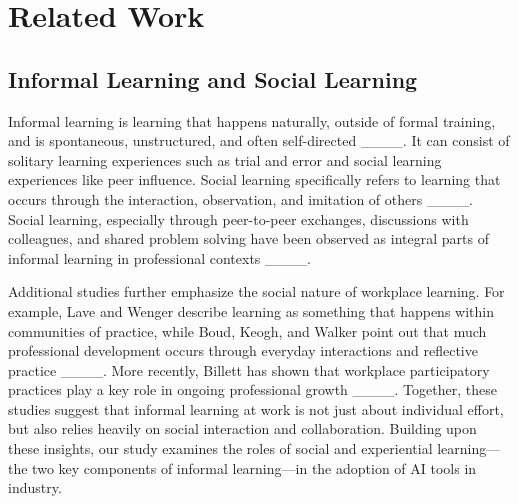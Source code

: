 \section{Related Work}
\subsection{Informal Learning and Social Learning}
Informal learning is learning that happens naturally, outside of formal training, and is spontaneous, unstructured, and often self-directed ____. It can consist of solitary learning experiences such as trial and error and social learning experiences like peer influence. Social learning specifically refers to learning that occurs through the interaction, observation, and imitation of others ____. Social learning, especially through peer-to-peer exchanges, discussions with colleagues, and shared problem solving have been observed as integral parts of informal learning in professional contexts ____.

Additional studies further emphasize the social nature of workplace learning. For example, Lave and Wenger describe learning as something that happens within communities of practice, while Boud, Keogh, and Walker point out that much professional development occurs through everyday interactions and reflective practice ____. More recently, Billett has shown that workplace participatory practices play a key role in ongoing professional growth ____. Together, these studies suggest that informal learning at work is not just about individual effort, but also relies heavily on social interaction and collaboration. Building upon these insights, our study examines the roles of social and experiential learning—the two key components of informal learning—in the adoption of AI tools in industry. 




